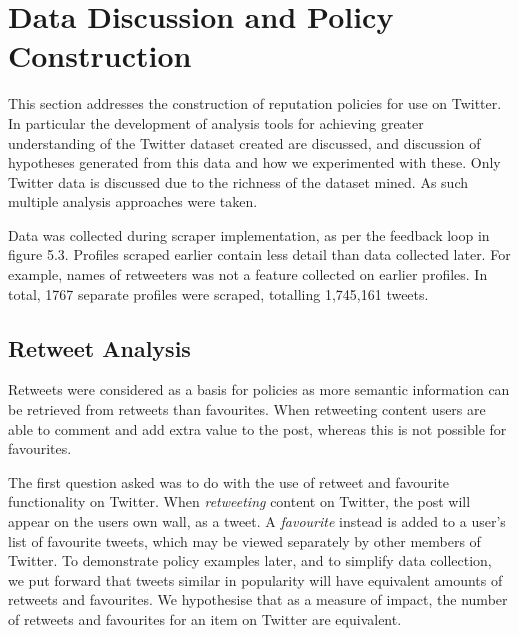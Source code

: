\chapter{Data Discussion and Policy Construction}\label{C:us}

This section addresses the construction of reputation policies for use on Twitter. In particular the development of analysis tools for achieving greater understanding of the Twitter dataset created are discussed, and discussion of hypotheses generated from this data and how we experimented with these. Only Twitter data is discussed due to the richness of the dataset mined. As such multiple analysis approaches were taken.

Data was collected during scraper implementation, as per the feedback loop in figure 5.3. Profiles scraped earlier contain less detail than data collected later. For example, names of retweeters was not a feature collected on earlier profiles. In total, 1767 separate profiles were scraped, totalling 1,745,161 tweets. 





\section{Retweet Analysis}

Retweets were considered as a basis for policies as more semantic information can be retrieved from retweets than favourites. When retweeting content users are able to comment and add extra value to the post, whereas this is not possible for favourites.

The first question asked was to do with the use of retweet and favourite functionality on Twitter. When \textit{retweeting} content on Twitter, the post will appear on the users own wall, as a tweet. A \textit{favourite} instead is added to a user's list of favourite tweets, which may be viewed separately by other members of Twitter. To demonstrate policy examples later, and to simplify data collection, we put forward that tweets similar in popularity will have equivalent amounts of retweets and favourites. We hypothesise that as a measure of impact, the number of retweets and favourites for an item on Twitter are equivalent.

